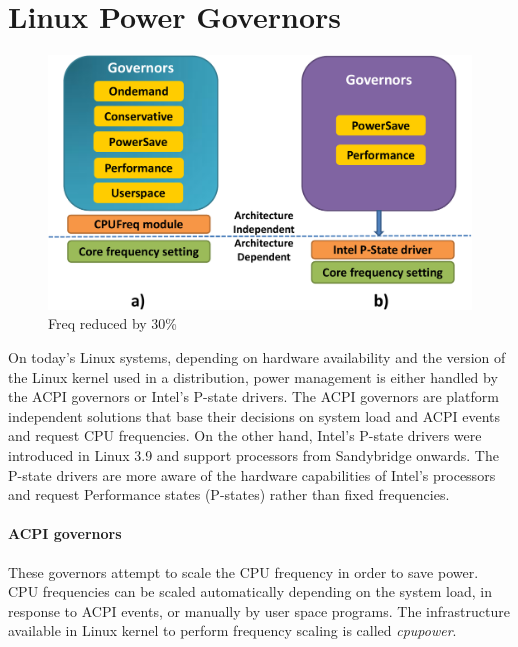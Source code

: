 \section{Linux Power Governors}\label{sec:linux-powergov}

\begin{figure}[h]
  \begin{center}
\includegraphics[width=\linewidth]{figs/gov-crop.pdf}
  \end{center}
  \vspace{-0.1in}
  \caption{Freq reduced by 30\%}
	\label{fig:gov}
\end{figure}

On today's Linux systems, depending on hardware availability and the version of the Linux kernel used in a distribution, power management 
is either handled by the ACPI governors or Intel's P-state drivers. The ACPI governors are platform independent solutions that base their decisions 
on system load and ACPI events and request CPU frequencies. On the other hand, Intel's P-state drivers were introduced in Linux 3.9 and support processors from Sandybridge onwards. 
The P-state drivers are more aware of the hardware capabilities of Intel's processors and request Performance states (P-states) rather than fixed frequencies.

\paragraph{ACPI governors}
These governors attempt to scale the CPU frequency in order to save power. CPU frequencies can be scaled automatically 
depending on the system load, in response to ACPI events, or manually by user space programs. The infrastructure available in Linux kernel to perform 
frequency scaling is called \emph{cpupower}.  

